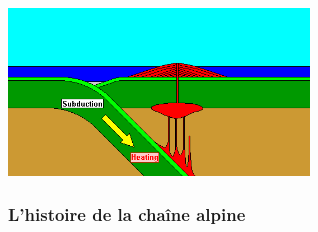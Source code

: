 \documentclass[a4paper,11pt]{article}
\begin{document}
\begin{center}
  \includegraphics[width=8cm]{Images/subduction.png}
\end{center}

\subsubsection{L'histoire de la chaîne alpine}
\end{document}
